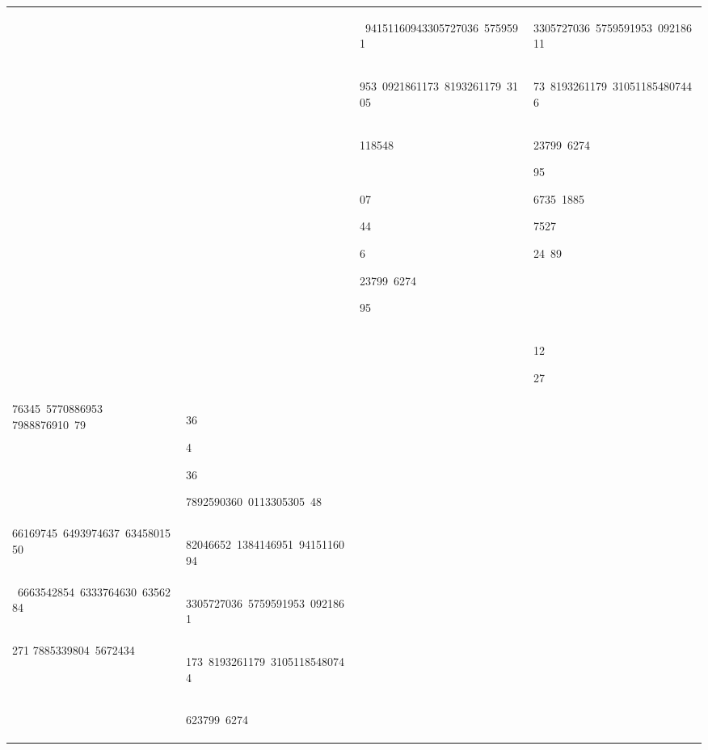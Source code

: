 \begin{table}[h]
\begin{tabular}{ l  l  l  l}
  &  & \colorbox{cm_63!40}{\strut \ 94151160943305727036\ 5759591} & \colorbox{cm_63!40}{\strut 3305727036\ 5759591953\ 09218611} \\ 
  &  & \colorbox{cm_63!40}{\strut 953\ 0921861173\ 8193261179\ 3105} & \colorbox{cm_63!40}{\strut 73\ 8193261179\ 310511854807446} \\ 
  &  & \colorbox{cm_63!40}{\strut 118548}\colorbox{cm_0!40}{\strut \ }\colorbox{cm_12!40}{\strut }\colorbox{cm_25!40}{\strut 07}\colorbox{cm_38!40}{\strut 44}\colorbox{cm_51!40}{\strut 6}\colorbox{cm_63!40}{\strut 23799\ 6274}\colorbox{cm_12!40}{\strut 95} & \colorbox{cm_63!40}{\strut 23799\ 6274}\colorbox{cm_12!40}{\strut 95}\colorbox{cm_0!40}{\strut 6735\ 1885}\colorbox{cm_12!40}{\strut 7527}\colorbox{cm_0!40}{\strut 24\ 89} \\ 
  &  &  & \colorbox{cm_0!40}{\strut 12}\colorbox{cm_12!40}{\strut 27} \\ 
  \midrule 76345\ 5770886953 7988876910\ 79 & \colorbox{cm_12!40}{\strut 36}\colorbox{cm_25!40}{\strut 4}\colorbox{cm_38!40}{\strut 36}\colorbox{cm_51!40}{\strut }\colorbox{cm_63!40}{\strut 7892590360\ 0113305305\ 48} &  &  \\ 
 66169745\ 6493974637\ 6345801550 & \colorbox{cm_63!40}{\strut 82046652\ 1384146951\ 9415116094} &  &  \\ 
 \ 6663542854\ 6333764630\ 6356284 & \colorbox{cm_63!40}{\strut 3305727036\ 5759591953\ 0921861} &  &  \\ 
 271 7885339804\ 5672434 & \colorbox{cm_63!40}{\strut 173\ 8193261179\ 31051185480744} &  &  \\ 
  & \colorbox{cm_63!40}{\strut 623799\ 6274} &  &  \\ 
  \midrule 
  \end{tabular}
    \label{tab:sample_pi}
\end{table}